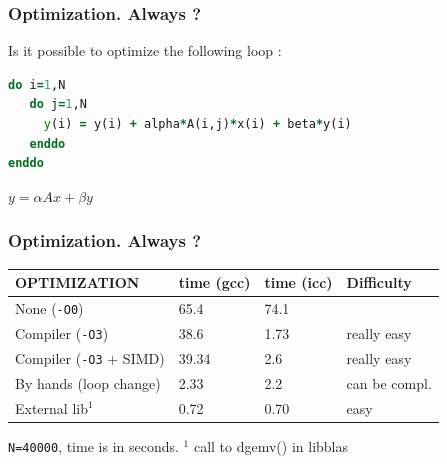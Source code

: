 \begin{frame}[containsverbatim]
	\frametitle{Optimization. Always ?}

Is it possible to optimize the following loop :

\begin{lstlisting}[language=Fortran,frame=lines]
do i=1,N
   do j=1,N
     y(i) = y(i) + alpha*A(i,j)*x(i) + beta*y(i)
   enddo
enddo
\end{lstlisting}

$y = \alpha A x + \beta y$

\end{frame}

\begin{frame}[containsverbatim]
	\frametitle{Optimization. Always ?}

\begin{center}
\begin{tabular}{|l|l|l|l|}
\hline
 \textbf{OPTIMIZATION} & \textbf{time (gcc)} & \textbf{time (icc)} & Difficulty \\
\hline
\hline
None ({\tt -O0}) & 65.4 & 74.1 & \\
\hline
Compiler ({\tt -O3}) & 38.6 & 1.73 & really easy\\
\hline
Compiler ({\tt -O3} + SIMD) & 39.34 & 2.6 & really easy\\
\hline
By hands (loop change) & 2.33 & 2.2 & can be compl.\\
\hline
External lib$^1$ & 0.72 & 0.70 & easy\\
\hline
\end{tabular}
\end{center}
\texttt{N=40000}, time is in seconds. $^1$  call to dgemv() in libblas

\end{frame}



